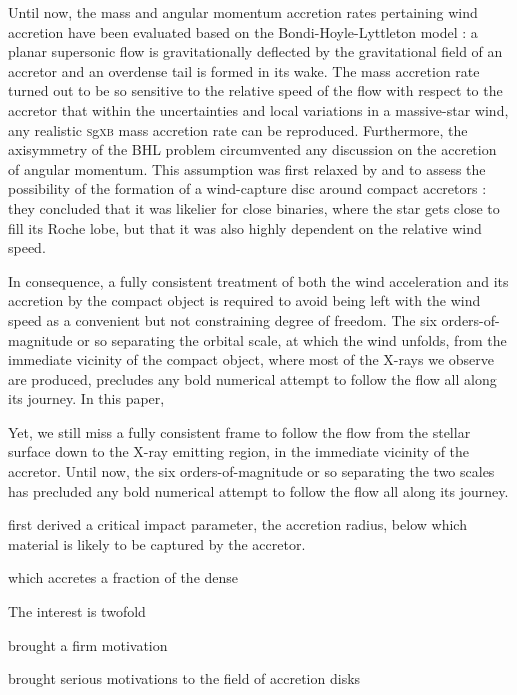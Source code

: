 \documentclass[a4paper,fleqn,usenatbib]{mnras}
\newcommand{\sgx}{\textsc{s}g\textsc{xb}\xspace}
\begin{document}
Until now, the mass and angular momentum accretion rates pertaining wind accretion have been evaluated based on the Bondi-Hoyle-Lyttleton model \citep[BHL, see][for a review]{Edgar:2004ip} : a planar supersonic flow is gravitationally deflected by the gravitational field of an accretor and an overdense tail is formed in its wake. The mass accretion rate turned out to be so sensitive to the relative speed of the flow with respect to the accretor that within the uncertainties and local variations in a massive-star wind, any realistic \sgx mass accretion rate can be reproduced. Furthermore, the axisymmetry of the BHL problem circumvented any discussion on the accretion of angular momentum. This assumption was first relaxed by \cite{Illarionov1975} and \cite{Shapiro1976} to assess the possibility of the formation of a wind-capture disc around compact accretors : they concluded that it was likelier for close binaries, where the star gets close to fill its Roche lobe, but that it was also highly dependent on the relative wind speed. 

In consequence, a fully consistent treatment of both the wind acceleration and its accretion by the compact object is required to avoid being left with the wind speed as a convenient but not constraining degree of freedom. The six orders-of-magnitude or so separating the orbital scale, at which the wind unfolds, from the immediate vicinity of the compact object, where most of the X-rays we observe are produced, precludes any bold numerical attempt to follow the flow all along its journey. In this paper, 




Yet, we still miss a fully consistent frame to follow the flow from the stellar surface down to the X-ray emitting region, in the immediate vicinity of the accretor. Until now, the six orders-of-magnitude or so separating the two scales has precluded any bold numerical attempt to follow the flow all along its journey.


\cite{Hoyle:1939fl} first derived a critical impact parameter, the accretion radius, below which material is likely to be captured by the accretor.

which accretes a fraction of the dense

The interest is twofold \citep{Martinez-Nunez2017}

brought a firm motivation

brought serious motivations to the field of accretion disks
\end{document}
